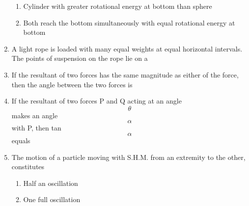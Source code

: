 \documentclass[11pt,a4paper]{article}
\begin{document}
\begin{enumerate}
\begin{enumerate}[label=\Alph*.]
\item{Cylinder with greater rotational energy at bottom than sphere}
\item{Both reach the bottom simultaneously with equal rotational energy at bottom}
\end{enumerate}
\item{A light rope is loaded with many equal weights at equal horizontal intervals. The points of suspension on the rope lie on a}
\\
\item{If the resultant of two forces has the same magnitude as either of the force, then the angle between the two forces is}
\\
\item{If the resultant of two forces P and Q acting at an angle $$\theta $$ makes an angle $$\alpha $$ with P, then tan $$\alpha $$ equals
}
\\
\item{The motion of a particle moving with S.H.M. from an extremity to the other, constitutes}
\begin{enumerate}[label=\Alph*.]
\item{Half an oscillation}
\item{One full oscillation}

\end{enumerate}
\end{enumerate}
\end{document}
